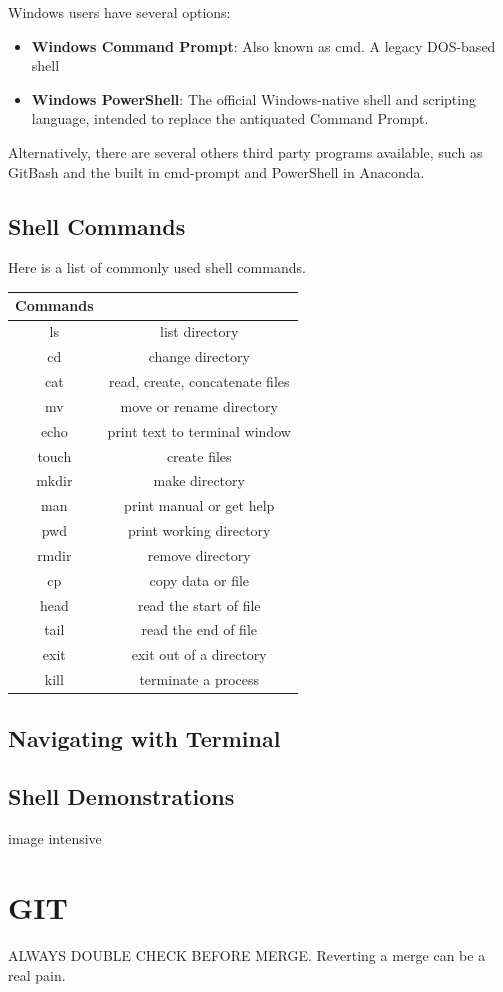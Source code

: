 \noindent Windows users have several options:
\begin{itemize}
	\item \textbf{Windows Command Prompt}: Also known as cmd. A legacy DOS-based shell
	\item \textbf{Windows PowerShell}: The official Windows-native shell and scripting language, intended to replace the antiquated Command Prompt. 
\end{itemize}

\noindent Alternatively, there are several others third party programs available, such as GitBash and the built in cmd-prompt and PowerShell in Anaconda.

\subsection{Shell Commands}

Here is a list of commonly used shell commands.

\begin{tabular}{|c|c|}
	\hline
	Commands &  \\
	\hline
	ls & list directory \\
	\hline
	cd & change directory \\
	\hline
	cat & read, create, concatenate files \\
	\hline
	mv & move or rename directory \\
	\hline
	echo & print text to terminal window \\
	\hline
	touch & create files \\
	\hline
	mkdir & make directory \\
	\hline
	man & print manual or get help \\
	\hline
	pwd & print working directory \\
	\hline
	rmdir & remove directory \\
	\hline
	cp & copy data or file \\
	\hline
	head & read the start of file \\
	\hline
	tail & read the end of file \\
	\hline
	exit & exit out of a directory \\
	\hline
	kill & terminate a process \\
	\hline
\end{tabular}
\subsection{Navigating with Terminal}
\subsection{Shell Demonstrations}
image intensive
\section{GIT}
ALWAYS DOUBLE CHECK BEFORE MERGE. Reverting a merge can be a real pain.